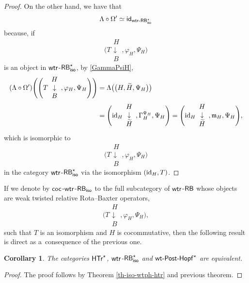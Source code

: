 \documentclass[pdftex]{sigma}
\numberwithin{equation}{section}
\newtheorem{Corollary}[Theorem]{Corollary}
\begin{document}
\begin{proof}
On the other hand, we have that \[\Lambda\circ\Omega'\simeq{\sf id}_{{\sf wtr}\textnormal{-}{\sf RB}^{\star}_{{\sf iso}}}\]
because, if
\[
\Biggl(T\begin{array}{c}H\\\downarrow\\B\end{array},\varphi_{H},\Psi_{H}\Biggr)
\]
is an object in ${\sf wtr}$-${\sf RB}^{\star}_{{\sf iso}}$,
by \eqref{GammaPsiH},
\begin{align*}
(\Lambda\circ\Omega')\Biggl(\Biggl(T\begin{array}{c}H\\\downarrow\\B\end{array},\varphi_{H},\Psi_{H}\Biggr)\Biggr)
&{}=\Lambda\bigl(\bigl(H,\widetilde{H},\Psi_{H}\bigr)\bigr)\\
&{}=\Biggl({\rm id}_{H}\begin{array}{c}H\\\downarrow\\\widetilde{H}\end{array},\Gamma_{H}^{\Psi_{H}},\Psi_{H}\Biggr)
 =\Biggl({\rm id}_{H}\begin{array}{c}H\\\downarrow\\\widetilde{H}\end{array},\mathfrak{m}_{H},\Psi_{H}\Biggr),
\end{align*}
which is isomorphic to
\[
\Biggl(T\begin{array}{c}H\\\downarrow\\B\end{array},\varphi_{H},\Psi_{H}\Biggr)
\] in the category ${\sf wtr}$-${\sf RB}^{\star}_{{\sf iso}}$ via the isomorphism $({\rm id}_{H},T)$.
\end{proof}

If we denote by ${\sf coc}$-${\sf wtr}$-${\sf RB}_{{\sf iso}}$ to the full subcategory of ${\sf wtr}$-${\sf RB}$ whose objects are weak twisted relative Rota--Baxter operators,
\[
\Biggl(T\begin{array}{c}H\\\downarrow\\B\end{array},\varphi_{H},\Psi_{H}\Biggr),
\]
such that $T$ is an isomorphism and $H$ is cocommutative, then the following result is direct as a~consequence of the previous one.
\begin{Corollary}

The categories $\sf{HTr}^{\star}$, ${\sf wtr}$-${\sf RB}^{\star}_{{\sf iso}}$ and ${\sf wt}\textnormal{-}{\sf Post}\textnormal{-}{\sf Hopf}^{\star}$ are equivalent.
\end{Corollary}
\begin{proof}
The proof follows by Theorem \ref{th-iso-wtph-htr} and previous theorem.
\end{proof}
\end{document}
